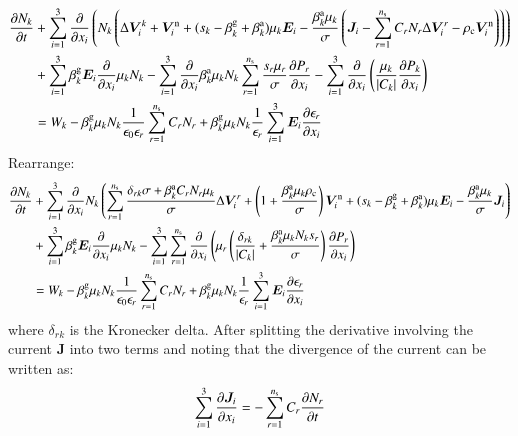\documentclass{warpdoc}
\newcommand{\ns}{{n_{\rm s}}}
\renewcommand{\vec}[1]{\bm{#1}}
\begin{document}
\begin{align}
  \frac{\partial N_k}{\partial t} &+ \sum_{i=1}^3 \frac{\partial}{\partial x_i}  \left(N_k \left( \Delta \vec{V}^k_i + \vec{V}^{\rm n}_i+ (s_k-\beta_k^{\rm g}+ \beta^{\rm a}_k) \mu_k  \vec{E}_i -  \frac{\beta^{\rm a}_k \mu_k}{\sigma} \left(\vec{J}_i-\sum_{r=1}^\ns C_r N_r \Delta \vec{V}_i^r -\rho_{\rm c} \vec{V}_i^{\rm n} \right)  \right)\right) 
\nonumber \\
&+ \sum_{i=1}^3 \beta_k^{\rm g} \vec{E}_i \frac{\partial }{\partial x_i} \mu_{k} N_{k}
- \sum_{i=1}^3  \frac{\partial}{\partial x_i}  \beta_k^{\rm a}\mu_k N_k \sum_{r=1}^\ns \frac{s_r \mu_r }{\sigma}  \frac{\partial P_r}{\partial x_i}
- \sum_{i=1}^3  \frac{\partial}{\partial x_i}  \left( 
   \frac{\mu_k }{|C_k|} \frac{\partial P_k}{\partial x_i}
\right)
\nonumber \\
&= W_k
-\beta_k^{\rm g} \mu_{k} N_{k}\frac{1}{\epsilon_0 \epsilon_r} \sum_{r=1}^\ns C_r N_r 
+\beta_k^{\rm g} \mu_{k} N_{k}\frac{1}{\epsilon_r} \sum_{i=1}^3 \vec{E}_i \frac{\partial \epsilon_r}{\partial x_i}  
\end{align}
%
Rearrange:
%
\begin{align}
  \frac{\partial N_k}{\partial t} &+ \sum_{i=1}^3 \frac{\partial}{\partial x_i}  N_k \left(  \sum_{r=1}^\ns \frac{\delta_{rk}\sigma+ \beta^{\rm a}_k C_r N_r \mu_k}{\sigma}   \Delta \vec{V}_i^r + \left(1+\frac{\beta^{\rm a}_k \mu_k \rho_{\rm c}}{\sigma}\right)\vec{V}^{\rm n}_i + (s_k-\beta_k^{\rm g}+ \beta^{\rm a}_k) \mu_k  \vec{E}_i -  \frac{\beta^{\rm a}_k \mu_k}{\sigma} \vec{J}_i   \right) 
\nonumber \\
&+ \sum_{i=1}^3 \beta_k^{\rm g} \vec{E}_i \frac{\partial }{\partial x_i} \mu_{k} N_{k}
- \sum_{i=1}^3 \sum_{r=1}^{\ns} \frac{\partial}{\partial x_i} \left( \mu_r \left( \frac{\delta_{rk}}{|C_k|}+ \frac{ \beta_k^{\rm a} \mu_k N_k s_r  }{\sigma} \right) \frac{\partial P_r}{\partial x_i}\right) 
\nonumber \\
&= W_k
-\beta_k^{\rm g} \mu_{k} N_{k}\frac{1}{\epsilon_0 \epsilon_r} \sum_{r=1}^\ns C_r N_r 
+\beta_k^{\rm g} \mu_{k} N_{k}\frac{1}{\epsilon_r} \sum_{i=1}^3 \vec{E}_i \frac{\partial \epsilon_r}{\partial x_i}  
\end{align}
%
where $\delta_{rk}$ is the Kronecker delta. 
After splitting the derivative involving the current $\vec{J}$ into two terms and noting that the divergence of the current can be written as:
%
\begin{equation}
\sum_{i=1}^3 \frac{\partial \vec{J}_i}{\partial x_i}=-\sum_{r=1}^\ns C_r \frac{\partial N_r}{\partial t}
\end{equation}
\end{document}
